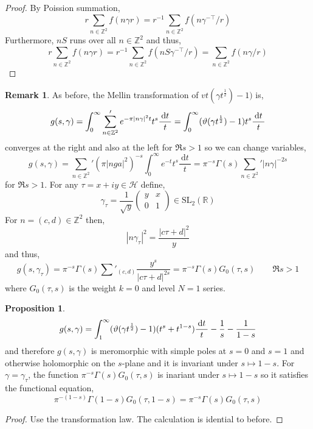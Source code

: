 \documentclass{article}
\newcommand{\SL}[2]{\mathrm{SL}_{#1}(#2)}
\newcommand{\Z}{\mathbb{Z}}
\newcommand{\R}{\mathbb{R}}
\renewcommand{\d}[1]{\: \mathrm{d}#1 \:}
\theoremstyle{definition}
\newtheorem{proposition}[theorem]{Proposition}
\newtheorem{remark}{Remark}[section]
\newcommand{\half}{\mathcal{H}}
\begin{document}
\begin{proof}
By Poission summation,
\[ r \sum_{n \in \Z^2} f(n \gamma r) =r^{-1} \sum_{n \in \Z^2} f(n \gamma^{- \top} / r) \]
Furthermore, $nS$ runs over all $n \in \Z^2$ and thus,
\[ r \sum_{n \in \Z^2} f(n \gamma r) = r^{-1} \sum_{n \in \Z^2} f(n S \gamma^{- \top} / r) = \sum_{n \in \Z^2} f(n \gamma / r) \]
\end{proof}

\begin{remark}
As before, the Mellin transformation of $vt(\gamma t^{\frac{1}{2}})  - 1)$ is,
\[ g(s, \gamma) = \int_0^\infty \sum_{n \in \Z^2}' e^{- \pi |n \gamma|^2 t } t^s \frac{\d{t}}{t} = \int_0^\infty (\vt(\gamma t^{\frac{1}{2}}) - 1) t^s \frac{\d{t}}{t} \] 
converges at the right and also at the left for $\Re{s} > 1$ so we can change variables,
\[ g(s, \gamma) = \sum_{n \in \Z^2}' (\pi |n ga
|^2)^{-s} \int_0^\infty e^{-t} t^s \frac{\d{t}}{t} = \pi^{-s} \Gamma(s) \sum_{n \in \Z^2}' |n \gamma|^{-2 s} \]
for $\Re{s} > 1$. For any $\tau = x + i y \in \half$ define,
\[ \gamma_\tau = \frac{1}{\sqrt{y}} \begin{pmatrix}
y & x 
\\
0 & 1 
\end{pmatrix} 
\in \SL{2}{\R} \]
For $n = (c,d) \in \Z^2$ then,
\[ | n \gamma_\tau |^2 = \frac{|c \tau + d|^2}{y} \]
and thus,
\[ g(s, \gamma_\tau) = \pi^{-s} \Gamma(s) \sum'_{(c,d)} \frac{y^s}{|c \tau + d|^{2s}} = \pi^{-s} \Gamma(s) G_0(\tau, s) \quad \quad \Re{s} > 1 \]
where $G_0(\tau, s)$ is the weight $k = 0$ and level $N = 1$ series.
\end{remark}

\begin{proposition}
\[ g(s, \gamma) = \int_1^\infty (\vt(\gamma t^{\frac{1}{2}}) - 1) (t^s + t^{1 - s}) \frac{\d{t}}{t} - \frac{1}{s} - \frac{1}{1 - s} \]
and therefore $g(s, \gamma)$ is meromorphic with simple poles at $s = 0$ and $s = 1$ and otherwise holomorphic on the $s$-plane and it is invariant under $s \mapsto 1 - s$. For $\gamma = \gamma_\tau$, the function $\pi^{-s} \Gamma(s) G_0(\tau, s)$ is inariant under $s \mapsto 1 - s$ so it satisfies the functional equation,
\[ \pi^{-(1 - s)} \Gamma(1 - s) G_0(\tau, 1 - s) = \pi^{-s} \Gamma(s) G_0(\tau, s) \]
\end{proposition}

\begin{proof}
Use the transformation law. The calculation is idential to before.
\end{proof}
\end{document}
